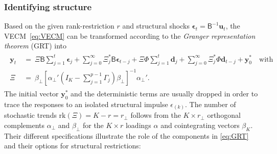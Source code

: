 \subsubsection{Identifying structure}
Based on the given rank-restriction $ r $ and structural shocks $ \boldsymbol{\epsilon}_{t} = \mathsf{B}^{-1} \boldsymbol{u}_{t} $, the VECM~\eqref{eq:VECM} can be transformed according to the \textit{Granger representation theorem} (GRT) into
\begin{align} \label{eq:GRT}
\begin{split}
	\boldsymbol{y}_{t} \ & = \ \Xi \mathsf{B} \sum_{j=1}^{t} \boldsymbol{\epsilon}_{j} + \sum_{j=0}^{\infty} \Xi^{*}_{j} \mathsf{B} \boldsymbol{\epsilon}_{t-j} + \Xi \Phi \sum_{j=1}^{t} \boldsymbol{d}_{j} + \sum_{j=0}^{\infty} \Xi^{*}_{j} \Phi \boldsymbol{d}_{t-j} + \boldsymbol{y}^{*}_{0} \quad \text{with} \\
	\Xi \ & = \ \beta_{\perp} \left[ \alpha_{\perp}' \left(I_K - \sum_{j=1}^{p-1} \Gamma_{j} \right) \beta_{\perp} \right]^{-1} \alpha_{\perp}'.
\end{split}
\end{align}
The initial vector $ \boldsymbol{y}^{*}_{0} $ and the deterministic terms are usually dropped in order to trace the responses to an isolated structural impulse $ \epsilon_{(k)} $. The number of stochastic trends $\text{rk}(\Xi) = K-r = r_\perp $ follows from the $ K \times r_\perp $ orthogonal complements $ \alpha_{\perp} $ and $ \beta_{\perp} $ for the $ K \times r $ loadings $ \alpha $ and cointegrating vectors $ \beta_K $. Their different specifications illustrate the role of the components in \eqref{eq:GRT} and their options for structural restrictions:
